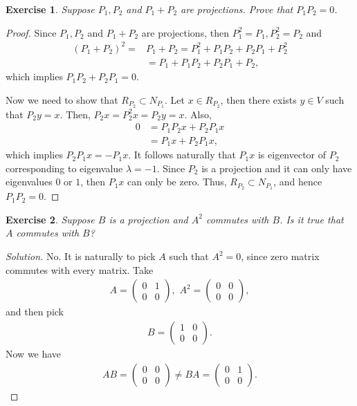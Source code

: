 \documentclass[11pt]{book}
\newtheorem{exercise}{Exercise}[section]
\theoremstyle{definition}
\numberwithin{equation}{chapter}
\begin{document}
\medskip

\begin{exercise}
Suppose $P_1, P_2$ and $P_1 + P_2$ are projections. Prove that $P_1 P_2 = 0$.
\end{exercise}
\begin{proof}
Since $P_1, P_2$ and $P_1 + P_2$ are projections, then $P_1^2 = P_1, P_2^2 = P_2$ and 
\begin{align*}
    \left(P_1 + P_2\right)^2 = & P_1 + P_2 = P_1^2 + P_1 P_2 + P_2 P_1 + P_2^2 \\
    & = P_1 + P_1 P_2 + P_2 P_1 + P_2,
\end{align*}
which implies $P_1 P_2 + P_2 P_1 = 0$. 

Now we need to show that $R_{P_2} \subset N_{P_1}$. Let $x \in R_{P_2}$, then there exists $y \in V$ such that $P_2 y = x$. Then, $P_2 x = P_2^2 x = P_2 y = x$. Also,
\begin{align*}
    0 & = P_1 P_2 x + P_2 P_1 x \\
      & = P_1 x + P_2 P_1 x,
\end{align*}
which implies $P_2 P_1 x = - P_1 x$. It follows naturally that $P_1 x$ is eigenvector of $P_2$ corresponding to eigenvalue $\lambda  = -1$. Since $P_2$ is a projection and it can only have eigenvalues $0$ or $1$, then $P_1 x$ can only be zero. Thus, $R_{P_2} \subset N_{P_1}$, and hence $P_1 P_2 = 0$.
\end{proof}

\medskip

\begin{exercise}
Suppose $B$ is a projection and $A^2$ commutes with $B$. Is it true that $A$ commutes with $B$?
\end{exercise}
\begin{proof}[Solution]
No. It is naturally to pick $A$ such that $A^2 = 0$, since zero matrix commutes with every matrix. Take
\begin{align*}
    A = \begin{pmatrix}
        0 & 1 \\
        0 & 0
    \end{pmatrix},\,\, A^2 = \begin{pmatrix}
        0 & 0 \\
        0 & 0
    \end{pmatrix},
\end{align*}
and then pick 
\begin{align*}
    B = \begin{pmatrix}
        1 & 0 \\
        0 & 0
    \end{pmatrix}.
\end{align*}
Now we have
\begin{align*}
    AB = \begin{pmatrix}
        0 & 0 \\
        0 & 0
    \end{pmatrix} \neq BA = \begin{pmatrix}
        0 & 1 \\
        0 & 0
    \end{pmatrix}.
\end{align*}
\end{proof}
\end{document}
